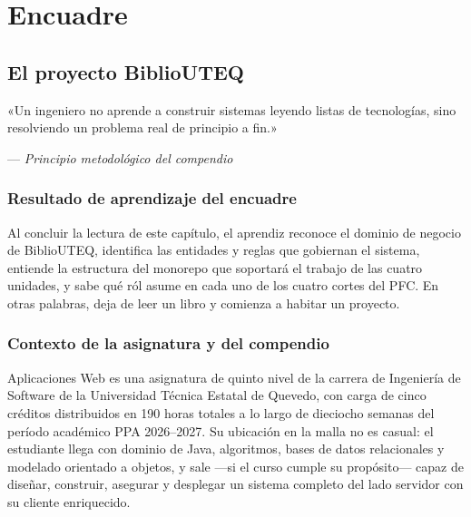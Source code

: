%

\part*{Encuadre}

\chapter{El proyecto BiblioUTEQ}
\label{cap:unidad0}

\epigraph{«Un ingeniero no aprende a construir sistemas leyendo listas de tecnolog\'ias, sino resolviendo un problema real de principio a fin.»}{--- \textit{Principio metodol\'ogico del compendio}}

\section*{Resultado de aprendizaje del encuadre}

Al concluir la lectura de este cap\'itulo, el aprendiz reconoce el dominio de negocio de BiblioUTEQ, identifica las entidades y reglas que gobiernan el sistema, entiende la estructura del monorepo que soportar\'a el trabajo de las cuatro unidades, y sabe qu\'e r\'ol asume en cada uno de los cuatro cortes del PFC. En otras palabras, deja de leer un libro y comienza a habitar un proyecto.

\section{Contexto de la asignatura y del compendio}
\label{sec:u0:contexto}

Aplicaciones Web es una asignatura de quinto nivel de la carrera de Ingenier\'ia de Software de la Universidad T\'ecnica Estatal de Quevedo, con carga de cinco cr\'editos distribuidos en 190 horas totales a lo largo de dieciocho semanas del per\'iodo acad\'emico PPA 2026--2027. Su ubicaci\'on en la malla no es casual: el estudiante llega con dominio de Java, algoritmos, bases de datos relacionales y modelado orientado a objetos, y sale ---si el curso cumple su prop\'osito--- capaz de dise\~nar, construir, asegurar y desplegar un sistema completo del lado servidor con su cliente enriquecido.

